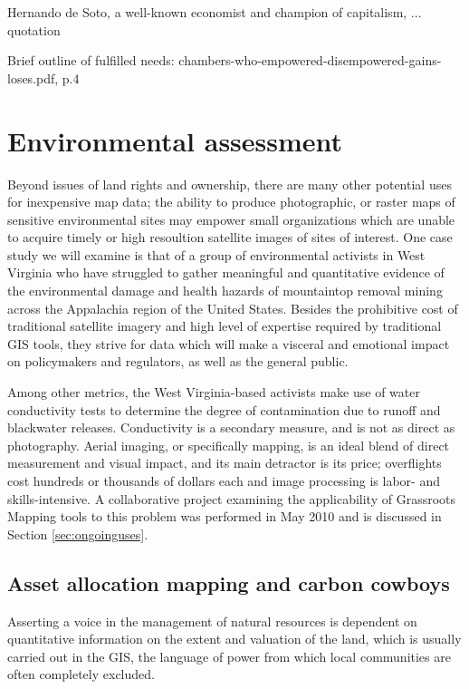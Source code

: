\documentclass[11pt]{report}
\begin{document}
Hernando de Soto, a well-known economist and champion of capitalism, ... quotation

Brief outline of fulfilled needs: chambers-who-empowered-disempowered-gains-loses.pdf, p.4


\section{Environmental assessment}

Beyond issues of land rights and ownership, there are many other potential uses for inexpensive map data; the ability to produce photographic, or raster maps of sensitive environmental sites may empower small organizations which are unable to acquire timely or high resoultion satellite images of sites of interest. One case study we will examine is that of a group of environmental activists in West Virginia who have struggled to gather meaningful and quantitative evidence of the environmental damage and health hazards of mountaintop removal mining across the Appalachia region of the United States. Besides the prohibitive cost of traditional satellite imagery and high level of expertise required by traditional GIS tools, they strive for data which will make a visceral and emotional impact on policymakers and regulators, as well as the general public. 

Among other metrics, the West Virginia-based activists make use of water conductivity tests to determine the degree of contamination due to runoff and blackwater releases. Conductivity is a secondary measure, and is not as direct as photography. Aerial imaging, or specifically mapping, is an ideal blend of direct measurement and visual impact, and its main detractor is its price; overflights cost hundreds or thousands of dollars each and image processing is labor- and skills-intensive. A collaborative project examining the applicability of Grassroots Mapping tools to this problem was performed in May 2010 and is discussed in Section \ref{sec:ongoinguses}.

\subsection{Asset allocation mapping and carbon cowboys}

Asserting a voice in the management of natural resources is dependent on quantitative information on the extent and valuation of the land, which is usually carried out in the GIS, the language of power from which local communities are often completely excluded.  
\end{document}
